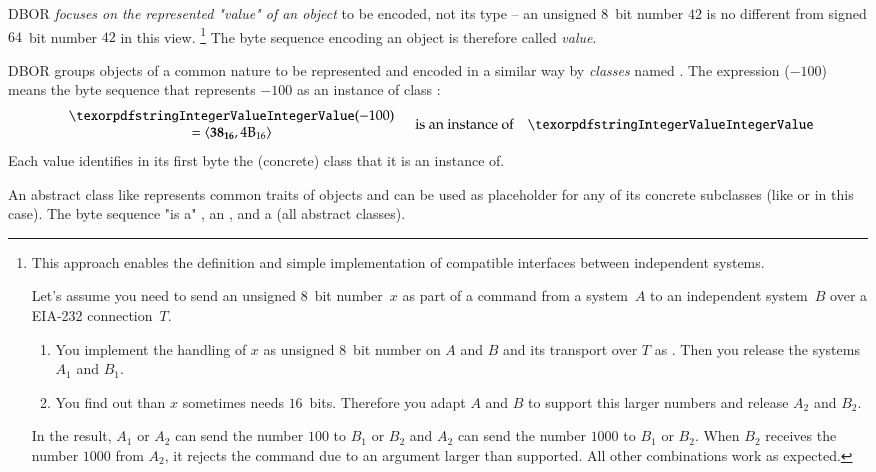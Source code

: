 \medskip
DBOR \emph{focuses on the represented "value" of an object} to be encoded, not its type --
an unsigned $8$~bit number $42$ is no different from signed $64$~bit number $42$ in this view.%
\footnote{%
    This approach enables the definition and simple implementation of compatible interfaces between independent systems.

    Let's assume you need to send an unsigned $8$~bit number~$x$ as part of a command from a system~$A$ to
    an independent system~$B$ over a EIA-232 connection~$T$.
    \begin{enumerate}
        \item
        You implement the handling of $x$ as unsigned $8$~bit number on $A$ and $B$ and its transport over $T$
        as \DborIntegerValue{}.
        Then you release the systems~$A_1$ and $B_1$.

        \item
        You find out than $x$ sometimes needs $16$~bits.
        Therefore you adapt $A$ and $B$ to support this larger numbers and release $A_2$ and $B_2$.
    \end{enumerate}

    In the result, $A_1$ or $A_2$ can send the number $100$ to $B_1$ or $B_2$ and
    $A_2$ can send the number $1000$ to $B_1$ or $B_2$.
    When $B_2$ receives the number $1000$ from $A_2$, it rejects the command due to an argument larger than supported.
    All other combinations work as expected.
}
The byte sequence encoding an object is therefore called \emph{value}.

\medskip
DBOR groups objects of a common nature to be represented and encoded in a similar way by \emph{classes}
named .
The expression \DborIntegerValue($-100$) means the byte sequence that represents $-100$ as an instance of
class \DborIntegerValue{}:
\begin{equation*}
    \begin{array}{c}
        \DborIntegerValue(-100) \\
        = \ByteSequence{\DborFirstByte\DborNumberValueColour{38}, \DborNextByte{4B}}
    \end{array}
    \quad\text{is an instance of}\quad \DborIntegerValue
\end{equation*}
Each value identifies in its first byte the (concrete) class that it is an instance of.

\medskip
An abstract class like \DborNumberValue{} represents common traits of objects and can be used as placeholder for any
of its concrete subclasses (like \DborIntegerValue{} or \DborInfinityValue{} in this case).
The byte sequence  "is a" \DborNumberValue{},
an \DborElementaryValue{}, and a \DborValue{} (all abstract classes).

